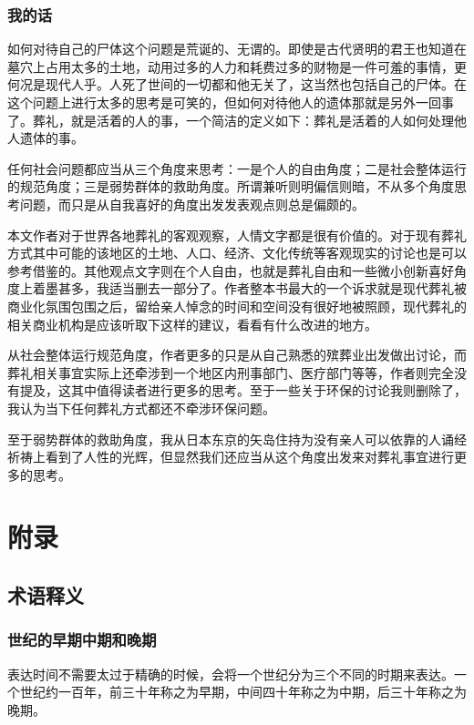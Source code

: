 \documentclass[12pt,oneside]{book}
\begin{document}
\section{我的话}
如何对待自己的尸体这个问题是荒诞的、无谓的。即使是古代贤明的君王也知道在墓穴上占用太多的土地，动用过多的人力和耗费过多的财物是一件可羞的事情，更何况是现代人乎。人死了世间的一切都和他无关了，这当然也包括自己的尸体。在这个问题上进行太多的思考是可笑的，但如何对待他人的遗体那就是另外一回事了。葬礼，就是活着的人的事，一个简洁的定义如下：葬礼是活着的人如何处理他人遗体的事。

任何社会问题都应当从三个角度来思考：一是个人的自由角度；二是社会整体运行的规范角度；三是弱势群体的救助角度。所谓兼听则明偏信则暗，不从多个角度思考问题，而只是从自我喜好的角度出发发表观点则总是偏颇的。

本文作者对于世界各地葬礼的客观观察，人情文字都是很有价值的。对于现有葬礼方式其中可能的该地区的土地、人口、经济、文化传统等客观现实的讨论也是可以参考借鉴的。其他观点文字则在个人自由，也就是葬礼自由和一些微小创新喜好角度上着墨甚多，我适当删去一部分了。作者整本书最大的一个诉求就是现代葬礼被商业化氛围包围之后，留给亲人悼念的时间和空间没有很好地被照顾，现代葬礼的相关商业机构是应该听取下这样的建议，看看有什么改进的地方。

从社会整体运行规范角度，作者更多的只是从自己熟悉的殡葬业出发做出讨论，而葬礼相关事宜实际上还牵涉到一个地区内刑事部门、医疗部门等等，作者则完全没有提及，这其中值得读者进行更多的思考。至于一些关于环保的讨论我则删除了，我认为当下任何葬礼方式都还不牵涉环保问题。

至于弱势群体的救助角度，我从日本东京的矢岛住持为没有亲人可以依靠的人诵经祈祷上看到了人性的光辉，但显然我们还应当从这个角度出发来对葬礼事宜进行更多的思考。





\part{附录}
\chapter{术语释义}
\section{世纪的早期中期和晚期}
表达时间不需要太过于精确的时候，会将一个世纪分为三个不同的时期来表达。一个世纪约一百年，前三十年称之为早期，中间四十年称之为中期，后三十年称之为晚期。
\end{document}

